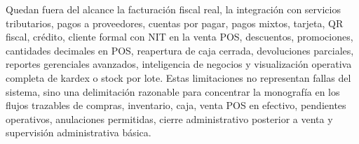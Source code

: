 Quedan fuera del alcance la facturación fiscal real, la integración con servicios tributarios, pagos a proveedores, cuentas por pagar, pagos mixtos, tarjeta, QR fiscal, crédito, cliente formal con NIT en la venta POS, descuentos, promociones, cantidades decimales en POS, reapertura de caja cerrada, devoluciones parciales, reportes gerenciales avanzados, inteligencia de negocios y visualización operativa completa de kardex o stock por lote. Estas limitaciones no representan fallas del sistema, sino una delimitación razonable para concentrar la monografía en los flujos trazables de compras, inventario, caja, venta POS en efectivo, pendientes operativos, anulaciones permitidas, cierre administrativo posterior a venta y supervisión administrativa básica.
